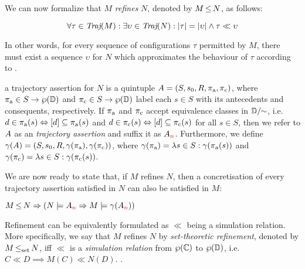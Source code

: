 

We can now formalize that $M$ \textit{refines} $N$, denoted by $M \operatorname{\leq} N$, as follows:

\begin{equation*}
\forall \tau \in \operatorname{\textit{Traj}}(M) : \exists \upsilon \in \operatorname{\textit{Traj}}(N) : | \tau | = | \upsilon | \wedge \tau \ll \upsilon
\end{equation*}

\noindent In other words, for every sequence of configurations $\tau$ permitted by $M$, there must exist a sequence $\upsilon$ for $N$ which approximates the behaviour of $\tau$ according to .

 a trajectory assertion for $N$ is a quintuple $A = (S, s_{0}, R, \operatorname{\pi_{\textrm{a}}}, \operatorname{\pi_{\textrm{c}}})$, where $\operatorname{\pi_{\textrm{a}}} \in S \rightarrow \wp(\mathbb{D})$ and $\operatorname{\pi_{\textrm{c}}} \in S \rightarrow \wp(\mathbb{D})$ label each $s \in S$ with its antecedents and consequents, respectively. If $\operatorname{\pi_{\textrm{a}}}$ and $\operatorname{\pi_{\textrm{c}}}$ accept equivalence classes in $\mathbb{D} / \mkern-6mu\sim$, i.e. $d \in \operatorname{\pi_{\textrm{a}}}(s) \Leftrightarrow [d] \subseteq \operatorname{\pi_{\textrm{a}}}(s)$ and $d \in \operatorname{\pi_{\textrm{c}}}(s) \Leftrightarrow [d] \subseteq \operatorname{\pi_{\textrm{c}}}(s)$ for all $s \in S$, then we refer to $A$ as an \textit{ trajectory assertion} and suffix it as $A_{\textcolor{red}{n}}$. Furthermore, we define $\gamma(A) = (S, s_{0}, R, \gamma(\operatorname{\pi_{\textrm{a}}}), \gamma(\operatorname{\pi_{\textrm{c}}}))$, where $\gamma(\operatorname{\pi_{\textrm{a}}}) = \lambda s \in S : \gamma(\operatorname{\pi_{\textrm{a}}}(s))$ and $\gamma(\operatorname{\pi_{\textrm{c}}}) = \lambda s \in S : \gamma(\operatorname{\pi_{\textrm{c}}}(s))$.


We are now ready to state that, if $M$ refines $N$, then a concretisation of every  trajectory assertion satisfied in $N$ can also be satisfied in $M$:

\begin{theorem} \label{thm:traj-refines}
$M \operatorname{\leq} N \Rightarrow (N \models A_{\textcolor{red}{n}} \Rightarrow M \models \gamma(A_{\textcolor{red}{n}}))$
\end{theorem}

Refinement can be equivalently formulated as $\ll$ being a simulation relation. More specifically, we say that $M$ refines $N$ by \textit{set-theoretic  refinement}, denoted by $M \operatorname{\operatorname{\leq}_{\textrm{set}}} N$, iff $\ll$ is a \textit{simulation relation} from $\wp(\mathbb{C})$ to $\wp(\mathbb{D})$, i.e. $C \ll D \implies M(C) \ll N(D)$. .

